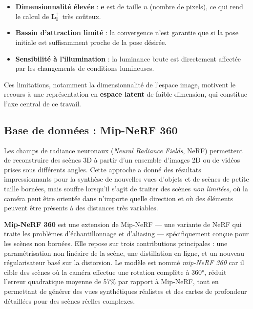 \begin{itemize}[noitemsep, topsep=4pt]
    \item \textbf{Dimensionnalité élevée} : $\mathbf{e}$ est de taille 
    $n$ (nombre de pixels), ce qui rend le calcul de $\mathbf{L_I^+}$ 
    très coûteux.
    \item \textbf{Bassin d'attraction limité} : la convergence n'est 
    garantie que si la pose initiale est suffisamment proche de la pose 
    désirée.
    \item \textbf{Sensibilité à l'illumination} : la luminance brute est 
    directement affectée par les changements de conditions lumineuses.
\end{itemize}

Ces limitations, notamment la dimensionnalité de l'espace image, motivent 
le recours à une représentation en \textbf{espace latent} de faible 
dimension, qui constitue l'axe central de ce travail.



\subsection{Base de données : Mip-NeRF 360}

Les champs de radiance neuronaux (\textit{Neural Radiance Fields}, NeRF) permettent de reconstruire des scènes 3D à partir d'un ensemble d'images 2D ou de vidéos prises sous différents angles. Cette approche a donné des résultats impressionnants pour la synthèse de nouvelles vues d'objets et de scènes de petite taille bornées, mais souffre lorsqu'il s'agit de traiter des scènes \textit{non limitées}, où la caméra peut être orientée dans n'importe quelle direction et où des éléments peuvent être présents à des distances très variables.


\textbf{Mip-NeRF 360} \cite{ref8} est une extension de 
Mip-NeRF — une variante de NeRF qui traite les problèmes d'échantillonnage et d'aliasing — spécifiquement conçue pour les scènes non bornées. Elle repose sur trois contributions principales : une paramétrisation non linéaire de la scène, une distillation en ligne, et un nouveau régularisateur basé sur la distorsion. Le modèle est nommé 
\textit{mip-NeRF 360} car il cible des scènes où la caméra effectue 
une rotation complète à 360°, réduit l'erreur quadratique moyenne de 
57\% par rapport à Mip-NeRF, tout en permettant de générer des vues 
synthétiques réalistes et des cartes de profondeur détaillées pour des 
scènes réelles complexes.

